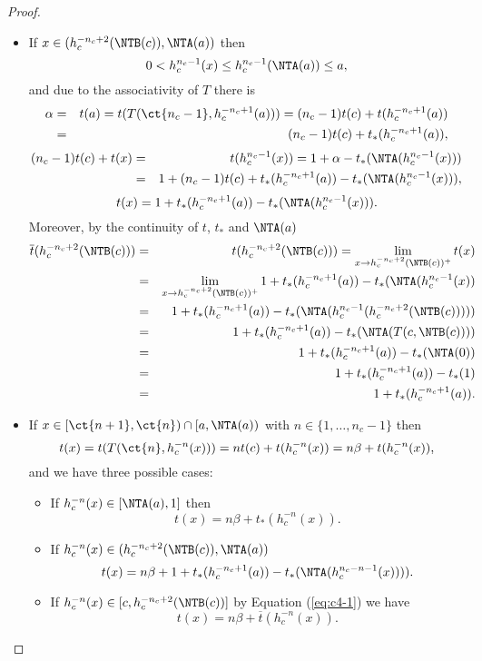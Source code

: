 \begin{proof}
\begin{enumerate}[label=(\roman*)]
\begin{itemize}
			\begin{itemize}
				\item If $x \in (h_c^{-n_c+2}(\NTB(c)),\NTA(a))$ then
				$$0 < h_c^{n_c-1}(x) \leq h_c^{n_c-1}(\NTA(a))\leq a,$$
				and due to the associativity of $T$ there is
				\begin{eqnarray}\label{eq:alpha:c4}
					\alpha & = & t(a) = t(T(\ct{n_c-1},h_c^{-n_c+1}(a))) = (n_c-1)t(c)+t(h_c^{-n_c+1}(a)) \nonumber \\
					 & = & (n_c-1)t(c)+t_*(h_c^{-n_c+1}(a)),
				\end{eqnarray}
				\begin{eqnarray*}
					(n_c-1)t(c)+t(x) & = & t(h_c^{n_c-1}(x)) = 1+\alpha-t_*(\NTA(h_c^{n_c-1}(x))) \\
					&=& 1+(n_c-1)t(c)+t_*(h_c^{-n_c+1}(a))-t_*(\NTA(h_c^{n_c-1}(x))),
				\end{eqnarray*}
				\begin{equation}\label{eq:c4-1}
					t(x) = 1+t_*(h_c^{-n_c+1}(a))-t_*(\NTA(h_c^{n_c-1}(x))).
				\end{equation}
				Moreover, by the continuity of $t$, $t_*$ and $\NTA(a)$
				\begin{eqnarray}\label{eq:c4-2}
					\overline{t}(h_c^{-n_c+2}(\NTB(c))) &=& t(h_c^{-n_c+2}(\NTB(c))) = \lim_{x \to h_c^{-n_c+2}(\NTB(c))^+}t(x)  \nonumber \\
					&=&  \lim_{x \to h_c^{-n_c+2}(\NTB(c))^+} 1+t_*(h_c^{-n_c+1}(a))-t_*(\NTA(h_c^{n_c-1}(x)) \nonumber \\
					&=&  1+t_*(h_c^{-n_c+1}(a))-t_*(\NTA(h_c^{n_c-1}(h_c^{-n_c+2}(\NTB(c))))) \nonumber \\
					&=& 1+t_*(h_c^{-n_c+1}(a))-t_*(\NTA(T(c,\NTB(c)))) \nonumber \\
					&=& 1+t_*(h_c^{-n_c+1}(a))-t_*(\NTA(0)) \nonumber \\
					&=& 1 + t_*(h_c^{-n_c+1}(a)) -t_*(1) \nonumber \\
					&=& 1 + t_*(h_c^{-n_c+1}(a)). 
				\end{eqnarray}
				\item If $x \in [\ct{n+1},\ct{n}) \cap [a,\NTA(a))$ with $n \in \{1,\dots, n_c-1\}$ then
				$$t(x) = t(T(\ct{n},h_c^{-n}(x))) = nt(c)+t(h_c^{-n}(x)) = n\beta+t(h_c^{-n}(x)),$$
				and we have three possible cases:
				\begin{itemize}
					\item If $h_c^{-n}(x) \in [\NTA(a),1]$ then
					$$t(x) = n\beta+t_*(h_c^{-n}(x)).$$
					\item If $h_c^{-n}(x) \in (h_c^{-n_c+2}(\NTB(c)),\NTA(a))$	$$t(x)=n\beta+1+t_*(h_c^{-n_c+1}(a))-t_*(\NTA(h_c^{n_c-n-1}(x)))).$$
					\item If $h_c^{-n}(x) \in [c,h_c^{-n_c+2}(\NTB(c))]$ by Equation (\ref{eq:c4-1}) we have
					$$t(x)=n\beta+\overline{t}(h_c^{-n}(x)).$$
					

\end{itemize}
\end{itemize}
\end{itemize}
\end{enumerate}
\end{proof}
